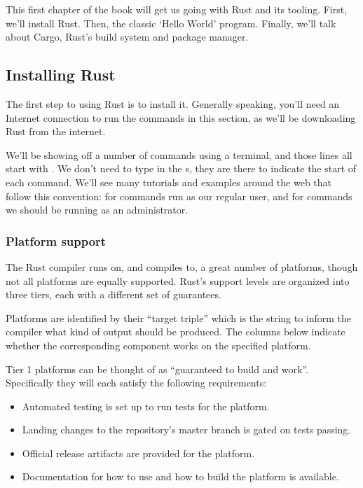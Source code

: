 This first chapter of the book will get us going with Rust and its tooling. First, we’ll install Rust. Then, the classic 
‘Hello World’ program. Finally, we’ll talk about Cargo, Rust’s build system and package manager.

\subsection{Installing Rust}

The first step to using Rust is to install it. Generally speaking, you’ll need an Internet connection to run the commands in 
this section, as we’ll be downloading Rust from the internet.

\blank

We’ll be showing off a number of commands using a terminal, and those lines all start with \code{\$}. We don't need to type in the 
\code{\$}s, they are there to indicate the start of each command. We’ll see many tutorials and examples around the web that follow 
this convention: \code{\$} for commands run as our regular user, and \code{\#} for commands we should be running as an administrator.

\subsubsection*{Platform support}

The Rust compiler runs on, and compiles to, a great number of platforms, though not all platforms are equally supported. 
Rust's support levels are organized into three tiers, each with a different set of guarantees.

\blank

Platforms are identified by their \enquote{target triple} which is the string to inform the compiler what kind of output should 
be produced. The columns below indicate whether the corresponding component works on the specified platform.


Tier 1 platforms can be thought of as \enquote{guaranteed to build and work}. Specifically they will each satisfy the 
following requirements:

\begin{itemize}
    \item{Automated testing is set up to run tests for the platform.}
    \item{Landing changes to the  repository's master branch is gated on tests passing.}
    \item{Official release artifacts are provided for the platform.}
    \item{Documentation for how to use and how to build the platform is available.}
\end{itemize}

